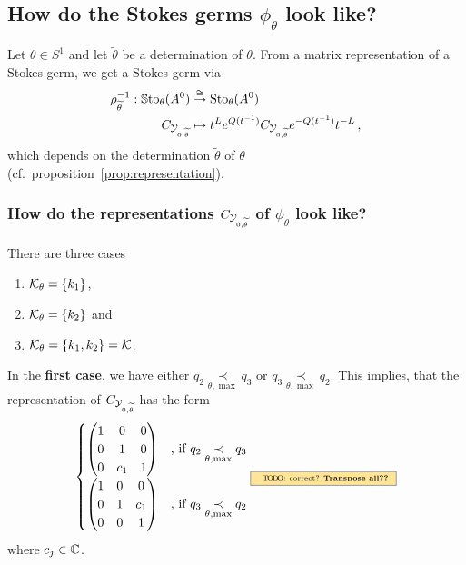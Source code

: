 \subsection{How do the Stokes germs $\phi_\theta$ look like?}
Let $\theta\in S^1$ and let $\tilde\theta$ be a determination of $\theta$.
From a matrix representation of a Stokes germ, we get a Stokes germ via
\begin{align*}
  \rho_{\widetilde\theta}^{-1}:
  \operatorname{\mathbb{S}to}_\theta(A^0)
  &\overset{\cong}\to
  \operatorname{Sto}_\theta(A^0)
  \\C_{\mathcal{Y}_{0,\widetilde\theta}} &\mapsto
  t^{L}e^{Q(t^{-1})}C_{\mathcal{Y}_{0,\widetilde\theta}} e^{-Q(t^{-1})}t^{-L} \,,
\end{align*}
which depends on the determination $\tilde\theta$ of $\theta$ 
(cf.\ proposition~\ref{prop:representation}).

\subsubsection{How do the representations $C_{\mathcal{Y}_{0,\widetilde\theta}}$ of
  $\phi_\theta$ look like?}
There are three cases
\begin{enumerate}
  \item $\mathcal{K}_\theta=\{k_1\}$,
  \item $\mathcal{K}_\theta=\{k_2\}$ and
  \item $\mathcal{K}_\theta=\{k_1,k_2\}=\mathcal{K}$.
\end{enumerate}
\begin{comment}
  The first two cases are similar, the last is different.
\end{comment}
In the \textbf{first case}, we have either
$q_2 \underset{\theta,\max}{\prec} q_3$ or
$q_3 \underset{\theta,\max}{\prec} q_2$.
This implies, that the representation of $C_{\mathcal{Y}_{0,\widetilde\theta}}$ has the
form
\[
  \begin{cases}
    \begin{pmatrix}
      1 & 0 & 0
    \\0 & 1 & 0
    \\0 & c_1 & 1
    \end{pmatrix} & \text{,~if~}
    q_2 \underset{\theta,\max}{\prec} q_3
  \\\begin{pmatrix}
      1 & 0 & 0
    \\0 & 1 & c_1
    \\0 & 0 & 1
    \end{pmatrix} & \text{,~if~}
    q_3 \underset{\theta,\max}{\prec} q_2
  \end{cases}
  \TODO[correct? \textbf{Transpose all??}]
\]
where $c_j\in\mathbb{C}$.
\TODO[is isomorphic to $\C$]

